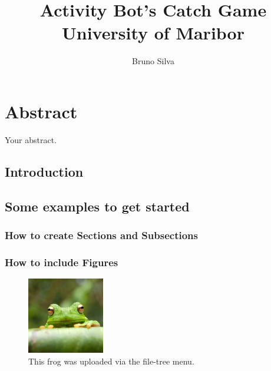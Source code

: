 \documentclass{report}
\title{Activity Bot's Catch Game\\
\Large{University of Maribor}}
\author{Bruno Silva}
\begin{document}
\maketitle

\chapter*{Abstract}
Your abstract. 

\tableofcontents

\section{Introduction}

\section{Some examples to get started}

\subsection{How to create Sections and Subsections}


\subsection{How to include Figures}




\begin{figure}
\centering
\includegraphics[width=0.3\textwidth]{resources/frog.jpg}
\caption{\label{fig:frog}This frog was uploaded via the file-tree menu.}
\end{figure}



\end{document}
